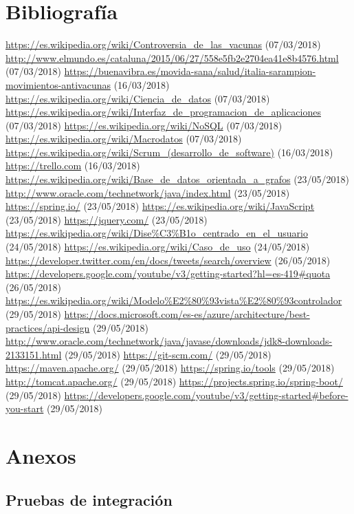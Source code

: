 \documentclass[11pt,a4paper]{article}
\begin{document}
\section{Bibliografía}
\bigskip

\begin{thebibliography}{0}
   \url{https://es.wikipedia.org/wiki/Controversia_de_las_vacunas} (07/03/2018)
   \url{http://www.elmundo.es/cataluna/2015/06/27/558e5fb2e2704ea41e8b4576.html} (07/03/2018)
   \url{https://buenavibra.es/movida-sana/salud/italia-sarampion-movimientos-antivacunas} (16/03/2018)
   \url{https://es.wikipedia.org/wiki/Ciencia_de_datos} (07/03/2018)
   \url{https://es.wikipedia.org/wiki/Interfaz_de_programacion_de_aplicaciones} (07/03/2018)
   \url{https://es.wikipedia.org/wiki/NoSQL} (07/03/2018)
   \url{https://es.wikipedia.org/wiki/Macrodatos} (07/03/2018)
   \url{https://es.wikipedia.org/wiki/Scrum_(desarrollo_de_software)} (16/03/2018)
   \url{https://trello.com} (16/03/2018)
   \url{https://es.wikipedia.org/wiki/Base_de_datos_orientada_a_grafos} (23/05/2018)
   \url{http://www.oracle.com/technetwork/java/index.html} (23/05/2018)
   \url{https://spring.io/} (23/05/2018)
   \url{https://es.wikipedia.org/wiki/JavaScript} (23/05/2018)
   \url{https://jquery.com/} (23/05/2018)
   \url{https://es.wikipedia.org/wiki/Dise%C3%B1o_centrado_en_el_usuario} (24/05/2018)
   \url{https://es.wikipedia.org/wiki/Caso_de_uso} (24/05/2018) 
   \url{https://developer.twitter.com/en/docs/tweets/search/overview} (26/05/2018) 
   \url{https://developers.google.com/youtube/v3/getting-started?hl=es-419#quota} (26/05/2018) 
   \url{https://es.wikipedia.org/wiki/Modelo%E2%80%93vista%E2%80%93controlador} (29/05/2018) 
   \url{https://docs.microsoft.com/es-es/azure/architecture/best-practices/api-design} (29/05/2018) 
   \url{http://www.oracle.com/technetwork/java/javase/downloads/jdk8-downloads-2133151.html} (29/05/2018) 
   \url{https://git-scm.com/} (29/05/2018) 
   \url{https://maven.apache.org/} (29/05/2018) 
   \url{https://spring.io/tools} (29/05/2018) 
   \url{http://tomcat.apache.org/} (29/05/2018) 
   \url{https://projects.spring.io/spring-boot/} (29/05/2018) 
   \url{https://developers.google.com/youtube/v3/getting-started#before-you-start} (29/05/2018) 
\end{thebibliography}
\newpage 


\section{Anexos}
\bigskip

\subsection{Pruebas de integración}\label{pruevasIntegracion} 
\end{document}

